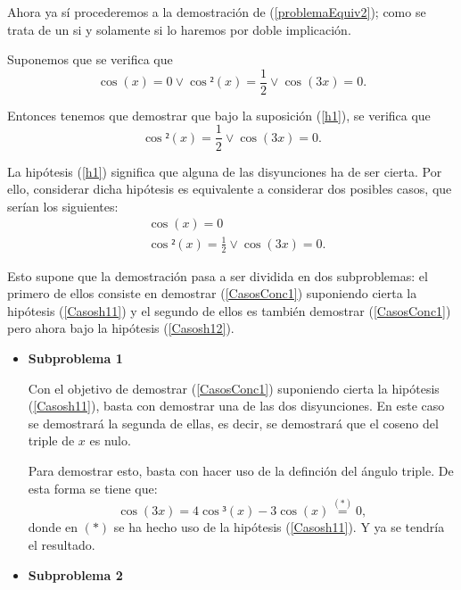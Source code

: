 \begin{demostracion}
  Ahora ya sí procederemos a la demostración de
  (\ref{problemaEquiv2}); como se trata de un si y solamente si
  lo haremos por doble implicación.

  \noindent
  \framebox{\longrightarrow} Suponemos que se verifica que
  \begin{equation}\label{Casosh1}\tag{h1}
    \cos(x)=0 \lor \cos²(x)=\frac{1}{2} \lor \cos(3x)=0.
  \end{equation}

  Entonces tenemos que demostrar que bajo la suposición (\ref{h1}),
  se verifica que
  \begin{equation}\label{CasosConc1}
     \cos²(x)=\frac{1}{2} \lor \cos(3x)=0.
  \end{equation}

  La hipótesis (\ref{h1}) significa que alguna de las disyunciones
  ha de ser cierta. Por ello, considerar dicha hipótesis es
  equivalente a considerar dos posibles casos, que serían los
  siguientes:
  \begin{align}
    &\cos(x)=0 \label{Casosh11}\tag{h11}\\
    &\cos²(x)=\frac{1}{2}\lor \cos(3x)=0. \label{Casosh12}\tag{h12}
  \end{align}

  Esto supone que la demostración pasa a ser dividida en
  dos subproblemas: el primero de
  ellos consiste en demostrar (\ref{CasosConc1}) suponiendo
  cierta la hipótesis (\ref{Casosh11}) y el segundo de ellos
  es también demostrar (\ref{CasosConc1}) pero ahora bajo la
  hipótesis (\ref{Casosh12}).

  \begin{itemize}
  \item \textbf{Subproblema 1}
    
    Con el objetivo de demostrar (\ref{CasosConc1}) suponiendo
    cierta la hipótesis (\ref{Casosh11}), basta con demostrar una
    de las dos disyunciones. En este caso se demostrará la segunda
    de ellas, es decir, se demostrará que el coseno del triple de
    \(x\) es nulo.

    Para demostrar esto, basta con hacer uso de la definción del
    ángulo triple. De esta forma se tiene que:
    \begin{equation}
      \cos(3x)=4\cos³(x)-3\cos(x)\stackrel{(*)}{=}0,
    \end{equation}
    donde en \((*)\) se ha hecho uso de la hipótesis
    (\ref{Casosh11}). Y ya se tendría el resultado.
    
  \item \textbf{Subproblema 2}


\end{itemize}
\end{demostracion}
